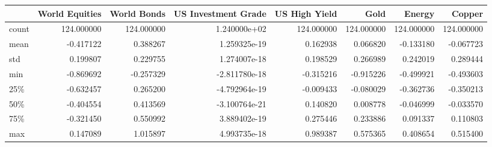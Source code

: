 \begin{tabular}{lrrrrrrr}
\toprule
{} &  World Equities &  World Bonds &  US Investment Grade &  US High Yield &        Gold &      Energy &      Copper \\
\midrule
count &      124.000000 &   124.000000 &         1.240000e+02 &     124.000000 &  124.000000 &  124.000000 &  124.000000 \\
mean  &       -0.417122 &     0.388267 &         1.259325e-19 &       0.162938 &    0.066820 &   -0.133180 &   -0.067723 \\
std   &        0.199807 &     0.229755 &         1.274007e-18 &       0.198529 &    0.266989 &    0.242019 &    0.289444 \\
min   &       -0.869692 &    -0.257329 &        -2.811780e-18 &      -0.315216 &   -0.915226 &   -0.499921 &   -0.493603 \\
25\%   &       -0.632457 &     0.265200 &        -4.792964e-19 &      -0.009433 &   -0.080029 &   -0.362736 &   -0.350213 \\
50\%   &       -0.404554 &     0.413569 &        -3.100764e-21 &       0.140820 &    0.008778 &   -0.046999 &   -0.033570 \\
75\%   &       -0.321450 &     0.550992 &         3.889402e-19 &       0.275446 &    0.233886 &    0.091337 &    0.110803 \\
max   &        0.147089 &     1.015897 &         4.993735e-18 &       0.989387 &    0.575365 &    0.408654 &    0.515400 \\
\bottomrule
\end{tabular}
